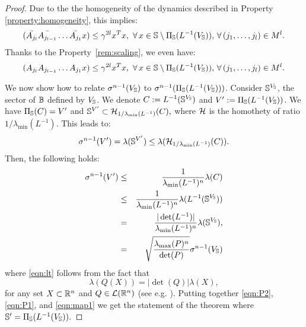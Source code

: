 \begin{proof}
Due to the  the homogeneity of the dynamics described in Property \ref{property:homogeneity}, this implies:
\begin{equation}\label{eqn:P}
(\bar{A_{j_l}} \bar{A_{j_{l-1}}} \dots \bar{A_{j_1}} x) \leq \gamma^{2l} x^T x,\,\, \forall\, x \in \mathbb{S} \setminus \Pi_{\mathbb{S}}(L^{-1}(V_{\mathbb{S}})), \,\forall\, (j_1,\dots,j_l) \in M^l.
\end{equation}
Thanks to the Property~\ref{rem:scaling}, we even have:
\begin{equation}\label{eqn:P1}
(A_{j_l} A_{j_{l-1}} \dots A_{j_1} x) \leq \gamma^{2l} x^T x,\,\, \forall\, x \in \mathbb{S} \setminus \Pi_{\mathbb{S}}(L^{-1}(V_{\mathbb{S}})), \,\forall\, (j_1,\dots,j_l) \in M^l.
\end{equation}

We now show how to relate $\sigma^{n-1}(V_{\mathbb{S}})$ to $\sigma^{n-1}(\Pi_{\mathbb{S}}(L^{-1}(V_{\mathbb{S}})))$. Consider $\mathbb{S}^{V_{\mathbb{S}}}$, the sector of $\mathbb{B}$ defined by $V_{\mathbb{S}}$. We denote $C:= L^{-1}(\mathbb{S}^{V_{\mathbb{S}}})$ and $V':=\Pi_{\mathbb{S}}(L^{-1}(V_{\mathbb{S}}))$. We have $\Pi_{\mathbb{S}}(C) = V'$ and $\mathbb{S}^{V'} \subset \mathcal{H}_{1/ \lambda_{\min}(L^{-1})}(C),$
where $\mathcal{H}$ is the homothety of ratio $1/ \lambda_{\min}(L^{-1})$. This leads to:
$$\sigma^{n-1}(V') = \lambda(\mathbb{S}^{V'}) \leq \lambda (\mathcal{H}_{1/ \lambda_{\min}(L^{-1})}(C)).$$ Then, the following holds: \begin{eqnarray}\nonumber\sigma^{n-1}(V') &\leq& \frac{1}{\lambda_{\min}(L^{-1})^n}\lambda(C) \\
\nonumber &\leq&\frac{1}{\lambda_{\min}(L^{-1})^n} \lambda( L^{-1}(\mathbb{S}^{V_{\mathbb{S}}}))\\ 
\label{eqn:lt} &=&\frac{|\det(L^{-1})|}{\lambda_{\min}(L^{-1})^n}\lambda(\mathbb{S}^{V_{\mathbb{S}}}),\\
 \label{eqn:map1} &=&\sqrt{\frac{\lambda_{\max}(P)^n}{\det(P)}}\sigma^{n-1}(V_{\mathbb{S}})
\end{eqnarray}
where \eqref{eqn:lt} follows from the fact that
$$ \lambda(Q(X)) = |\det(Q)| \lambda(X),$$
for any set $X \subset \mathbb{R}^n$ and $Q \in \mathcal{L}(\mathbb{R}^n)$ (see e.g. \cite{rudin}).
Putting together \eqref{eqn:P2}, \eqref{eqn:P1}, and \eqref{eqn:map1} we get the statement of the theorem where $\mathbb{S}' = \Pi_{\mathbb{S}}(L^{-1}(V_{\mathbb{S}})).$
\end{proof}

